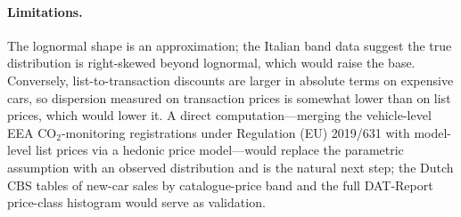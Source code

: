 \paragraph{Limitations.}
The lognormal shape is an approximation; the Italian band data suggest the true distribution is right-skewed beyond lognormal, which would raise the base. Conversely, list-to-transaction discounts are larger in absolute terms on expensive cars, so dispersion measured on transaction prices is somewhat lower than on list prices, which would lower it. A direct computation---merging the vehicle-level EEA CO$_2$-monitoring registrations under Regulation (EU) 2019/631 \citep{EEA2026} with model-level list prices via a hedonic price model---would replace the parametric assumption with an observed distribution and is the natural next step; the Dutch CBS tables of new-car sales by catalogue-price band and the full DAT-Report price-class histogram would serve as validation.